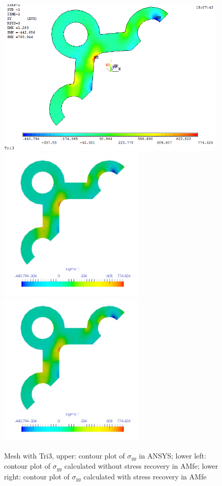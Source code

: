 \begin{figure}[htbp]
	\begin{center}
		\includegraphics[width=11cm,clip]{TTri3_Syy.png} 	
		\includegraphics[width=7cm,clip]{TTri3_Syy_PD.png} 	
		\includegraphics[width=7cm,clip]{TTri3_Syy_P.png} 		
		\caption{Mesh with Tri3, upper: contour plot of $\sigma_{yy}$ in ANSYS; lower left: contour plot of $\sigma_{yy}$ calculated without stress recovery in AMfe; lower right: contour plot of $\sigma_{yy}$ calculated with stress recovery in AMfe} \label{fig: Tri3_Syy}
	\end{center}
\end{figure}
\clearpage 

